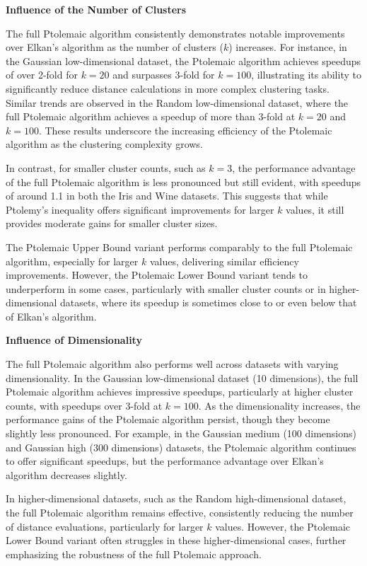\textbf{Influence of the Number of Clusters}

The full Ptolemaic algorithm consistently demonstrates notable improvements over Elkan’s algorithm as the number of clusters ($k$) increases. For instance, in the Gaussian low-dimensional dataset, the Ptolemaic algorithm achieves speedups of over 2-fold for $k = 20$ and surpasses 3-fold for $k = 100$, illustrating its ability to significantly reduce distance calculations in more complex clustering tasks. Similar trends are observed in the Random low-dimensional dataset, where the full Ptolemaic algorithm achieves a speedup of more than 3-fold at $k = 20$ and $k = 100$. These results underscore the increasing efficiency of the Ptolemaic algorithm as the clustering complexity grows.

In contrast, for smaller cluster counts, such as $k = 3$, the performance advantage of the full Ptolemaic algorithm is less pronounced but still evident, with speedups of around 1.1 in both the Iris and Wine datasets. This suggests that while Ptolemy’s inequality offers significant improvements for larger $k$ values, it still provides moderate gains for smaller cluster sizes.

The Ptolemaic Upper Bound variant performs comparably to the full Ptolemaic algorithm, especially for larger $k$ values, delivering similar efficiency improvements. However, the Ptolemaic Lower Bound variant tends to underperform in some cases, particularly with smaller cluster counts or in higher-dimensional datasets, where its speedup is sometimes close to or even below that of Elkan’s algorithm.

\textbf{Influence of Dimensionality}

The full Ptolemaic algorithm also performs well across datasets with varying dimensionality. In the Gaussian low-dimensional dataset (10 dimensions), the full Ptolemaic algorithm achieves impressive speedups, particularly at higher cluster counts, with speedups over 3-fold at $k = 100$. As the dimensionality increases, the performance gains of the Ptolemaic algorithm persist, though they become slightly less pronounced. For example, in the Gaussian medium (100 dimensions) and Gaussian high (300 dimensions) datasets, the Ptolemaic algorithm continues to offer significant speedups, but the performance advantage over Elkan’s algorithm decreases slightly.

In higher-dimensional datasets, such as the Random high-dimensional dataset, the full Ptolemaic algorithm remains effective, consistently reducing the number of distance evaluations, particularly for larger $k$ values. However, the Ptolemaic Lower Bound variant often struggles in these higher-dimensional cases, further emphasizing the robustness of the full Ptolemaic approach.

